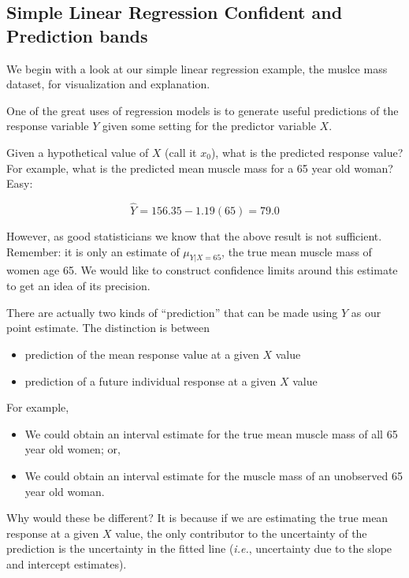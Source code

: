 \documentclass[
]{book}
\providecommand{\tightlist}{%
  \setlength{\itemsep}{0pt}\setlength{\parskip}{0pt}}
\begin{document}
\hypertarget{simple-linear-regression-confident-and-prediction-bands}{%
\subsection{Simple Linear Regression Confident and Prediction bands}\label{simple-linear-regression-confident-and-prediction-bands}}

We begin with a look at our simple linear regression example, the muslce mass dataset, for visualization and explanation.

One of the great uses of regression models is to generate useful predictions of the response variable \(Y\) given some setting for the predictor variable \(X\).

Given a hypothetical value of \(X\) (call it \(x_0\)), what is the predicted response value?
For example, what is the predicted mean muscle mass for a 65 year old woman? Easy:

\[\hat{Y} = 156.35 - 1.19(65) = 79.0\]

However, as good statisticians we know that the above result is not sufficient.
Remember: it is only an estimate of \(\mu_{Y|X=65}\), the true mean muscle mass of women age 65.
We would like to construct confidence limits around this estimate to get an idea of its precision.

There are actually two kinds of ``prediction'' that can be made using \(\hat{Y}\) as our point estimate.
The distinction is between

\begin{itemize}
\tightlist
\item
  prediction of the mean response value at a given \(X\) value
\item
  prediction of a future individual response at a given \(X\) value
\end{itemize}

For example,

\begin{itemize}
\tightlist
\item
  We could obtain an interval estimate for the true mean muscle mass of all 65 year old women; or,
\item
  We could obtain an interval estimate for the muscle mass of an unobserved 65 year old woman.
\end{itemize}

Why would these be different?
It is because if we are estimating the true mean response at a given \(X\) value, the only contributor to the uncertainty of the prediction is the uncertainty in the fitted line (\emph{i.e.}, uncertainty due to the slope and intercept estimates).
\end{document}
